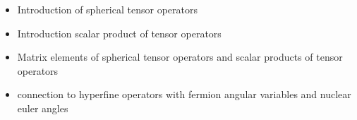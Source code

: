 
\begin{itemize}
\item Introduction of spherical tensor operators
\item Introduction scalar product of tensor operators
\item Matrix elements of spherical tensor operators and scalar products of tensor operators
\item connection to hyperfine operators with fermion angular variables and nuclear euler angles
\end{itemize}
